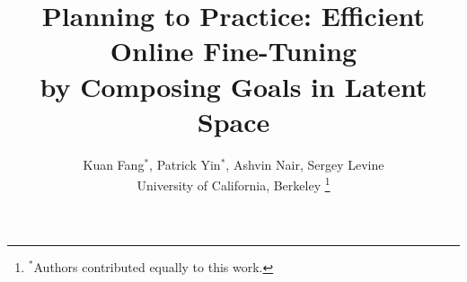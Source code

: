 \documentclass[letterpaper, 10 pt, conference]{ieeeconf}  %
\title{
\LARGE \bf
Planning to Practice: Efficient Online Fine-Tuning \\by Composing Goals in Latent Space
}
\author{
Kuan Fang$^*$, Patrick Yin$^*$, Ashvin Nair, Sergey Levine\\
University of California, Berkeley
\thanks{$^{*}$Authors contributed equally to this work.}
}
\begin{document}
\maketitle
\thispagestyle{empty}
\pagestyle{empty}

\begin{abstract}

\end{abstract}
\end{document}
